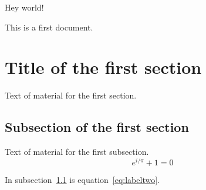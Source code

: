 \documentclass{article}
\begin{document}
Hey world!

This is a first document.

\section{Title of the first section}

Text of material for the first section.


\subsection{Subsection of the first section}
\label{subsec:labelone}

Text of material for the first subsection.
\begin{equation}
  e^{i/\pi}+1 = 0
\label{eq:labeltwo}
\end{equation}

In subsection~\ref{subsec:labelone} is equation~\ref{eq:labeltwo}.



\end{document}
